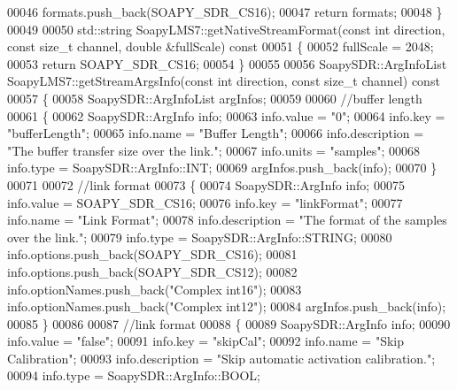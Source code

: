 \begin{DoxyCode}
00046     formats.push\_back(SOAPY_SDR_CS16);
00047     \textcolor{keywordflow}{return} formats;
00048 \}
00049 
00050 std::string SoapyLMS7::getNativeStreamFormat(\textcolor{keyword}{const} \textcolor{keywordtype}{int} direction, \textcolor{keyword}{const} \textcolor{keywordtype}{size\_t} channel, \textcolor{keywordtype}{double} &fullScale)\textcolor{keyword}{
       const}
00051 \textcolor{keyword}{}\{
00052     fullScale = 2048;
00053     \textcolor{keywordflow}{return} SOAPY_SDR_CS16;
00054 \}
00055 
00056 SoapySDR::ArgInfoList SoapyLMS7::getStreamArgsInfo(\textcolor{keyword}{const} \textcolor{keywordtype}{int} direction, \textcolor{keyword}{const} \textcolor{keywordtype}{size\_t} channel)\textcolor{keyword}{ const}
00057 \textcolor{keyword}{}\{
00058     SoapySDR::ArgInfoList argInfos;
00059 
00060     \textcolor{comment}{//buffer length}
00061     \{
00062         SoapySDR::ArgInfo info;
00063         info.value = \textcolor{stringliteral}{"0"};
00064         info.key = \textcolor{stringliteral}{"bufferLength"};
00065         info.name = \textcolor{stringliteral}{"Buffer Length"};
00066         info.description = \textcolor{stringliteral}{"The buffer transfer size over the link."};
00067         info.units = \textcolor{stringliteral}{"samples"};
00068         info.type = SoapySDR::ArgInfo::INT;
00069         argInfos.push\_back(info);
00070     \}
00071 
00072     \textcolor{comment}{//link format}
00073     \{
00074         SoapySDR::ArgInfo info;
00075         info.value = SOAPY_SDR_CS16;
00076         info.key = \textcolor{stringliteral}{"linkFormat"};
00077         info.name = \textcolor{stringliteral}{"Link Format"};
00078         info.description = \textcolor{stringliteral}{"The format of the samples over the link."};
00079         info.type = SoapySDR::ArgInfo::STRING;
00080         info.options.push\_back(SOAPY_SDR_CS16);
00081         info.options.push\_back(SOAPY_SDR_CS12);
00082         info.optionNames.push\_back(\textcolor{stringliteral}{"Complex int16"});
00083         info.optionNames.push\_back(\textcolor{stringliteral}{"Complex int12"});
00084         argInfos.push\_back(info);
00085     \}
00086 
00087     \textcolor{comment}{//link format}
00088     \{
00089         SoapySDR::ArgInfo info;
00090         info.value = \textcolor{stringliteral}{"false"};
00091         info.key = \textcolor{stringliteral}{"skipCal"};
00092         info.name = \textcolor{stringliteral}{"Skip Calibration"};
00093         info.description = \textcolor{stringliteral}{"Skip automatic activation calibration."};
00094         info.type = SoapySDR::ArgInfo::BOOL;

\end{DoxyCode}
